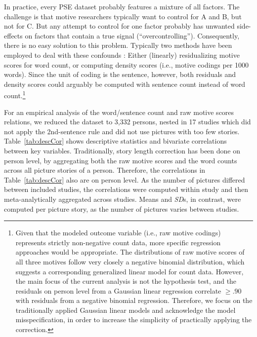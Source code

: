 \documentclass[man,a4paper,mask]{apa6}\usepackage[]{graphicx}\usepackage[]{color}
\begin{document}
In practice, every PSE dataset probably features a mixture of all factors. The challenge is that motive researchers typically want to control for A and B, but not for C. But any attempt to control for one factor probably has unwanted side-effects on factors that contain a true signal (``overcontrolling''). Consequently, there is no easy solution to this problem. Typically two methods have been employed to deal with these confounds \parencite{schultheiss_MeasuringImplicitMotives_2007}: Either (linearly) residualizing motive scores for word count, or computing density scores (i.e., motive codings per 1000 words). Since the unit of coding is the sentence, however, both residuals and density scores could arguably be computed with sentence count instead of word count.\footnote{Given that the modeled outcome variable (i.e., raw motive codings) represents strictly non-negative count data, more specific regression approaches would be appropriate. The distributions of raw motive scores of all three motives follow very closely a negative binomial distribution, which suggests a corresponding generalized linear model for count data. However, the main focus of the current analysis is not the hypothesis test, and the residuals on person level from a Gaussian linear regression correlate $\geq .90$ with residuals from a negative binomial regression. Therefore, we focus on the traditionally applied Gaussian linear models and acknowledge the model misspecification, in order to increase the simplicity of practically applying the correction.}

For an empirical analysis of the word/sentence count and raw motive scores relations, we reduced the dataset to 3,332 persons, nested in 17 studies which did not apply the 2nd-sentence rule and did not use pictures with too few stories. 
Table~\ref{tab:descCor} shows descriptive statistics and bivariate correlations between key variables. 
Traditionally, story length correction has been done on person level, by aggregating both the raw motive scores and the word counts across all picture stories of a person. 
Therefore, the correlations in Table~\ref{tab:descCor} also are on person level. 
As the number of pictures differed between included studies, the correlations were computed within study and then meta-analytically aggregated across studies. Means and \emph{SD}s, in contrast, were computed per picture story, as the number of pictures varies between studies. 
\end{document}
